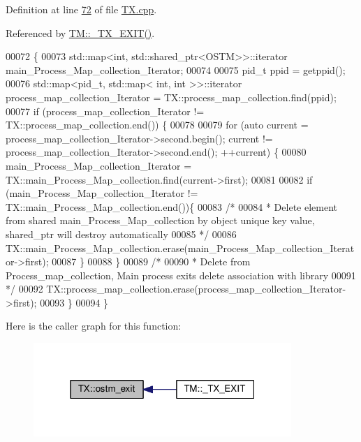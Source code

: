 Definition at line \hyperlink{_t_x_8cpp_source_l00072}{72} of file \hyperlink{_t_x_8cpp_source}{T\+X.\+cpp}.



Referenced by \hyperlink{_t_m_8cpp_source_l00100}{T\+M\+::\+\_\+\+T\+X\+\_\+\+E\+X\+I\+T()}.


\begin{DoxyCode}
00072                    \{
00073     std::map<int, std::shared\_ptr<OSTM>>::iterator main\_Process\_Map\_collection\_Iterator;
00074      
00075     pid\_t ppid = getppid();
00076     std::map<pid\_t, std::map< int, int >>::iterator process\_map\_collection\_Iterator = 
      TX::process\_map\_collection.find(ppid);
00077     \textcolor{keywordflow}{if} (process\_map\_collection\_Iterator != TX::process\_map\_collection.end()) \{
00078 
00079         \textcolor{keywordflow}{for} (\textcolor{keyword}{auto} current = process\_map\_collection\_Iterator->second.begin(); current != 
      process\_map\_collection\_Iterator->second.end(); ++current) \{
00080             main\_Process\_Map\_collection\_Iterator = TX::main\_Process\_Map\_collection.find(current->first);
00081 
00082             \textcolor{keywordflow}{if} (main\_Process\_Map\_collection\_Iterator != TX::main\_Process\_Map\_collection.end())\{
00083                 \textcolor{comment}{/*}
00084 \textcolor{comment}{                 * Delete element from shared main\_Process\_Map\_collection by object unique key value,
       shared\_ptr will destroy automatically
}
00085 \textcolor{comment}{                 */}
00086                 TX::main\_Process\_Map\_collection.erase(main\_Process\_Map\_collection\_Iterator->first);      
00087             \}
00088         \}
00089         \textcolor{comment}{/*}
00090 \textcolor{comment}{         * Delete from Process\_map\_collection, Main process exits delete association with library
}
00091 \textcolor{comment}{         */}
00092         TX::process\_map\_collection.erase(process\_map\_collection\_Iterator->first);
00093     \}
00094 \}
\end{DoxyCode}


Here is the caller graph for this function\+:\nopagebreak
\begin{figure}[H]
\begin{center}
\leavevmode
\includegraphics[width=277pt]{class_t_x_aa9739c5c2077454c779098db7baefc2b_icgraph}
\end{center}
\end{figure}


